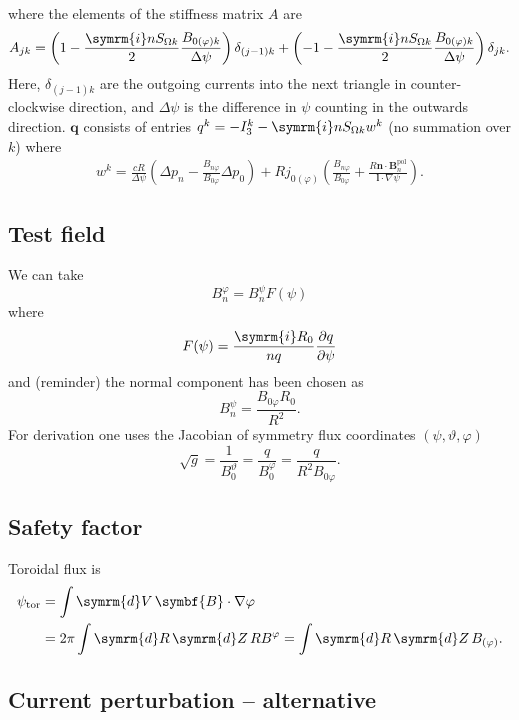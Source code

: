 \documentclass[a4paper, 10pt, english]{article}
\let\temp\vartheta
\let\vartheta\theta
\let\theta\temp
\let\temp\varphi
\let\varphi\phi
\let\phi\temp
\let\vec\symbf
\newcommand*\diff{\ensuremath{\symrm{d}}}
\newcommand*\im{\ensuremath{\symrm{i}}}
\newcommand*\pd[2][]{\ensuremath{\frac{\partial #1}{\partial #2}}}
\newcommand*\pol{\ensuremath{\textrm{pol}}}
\newcommand*\tor{\ensuremath{\textrm{tor}}}
\begin{document}
where the elements of the stiffness matrix $A$ are
\begin{gather}
  A_{jk} = \left( 1 - \frac{\im n S_{\Omega k}}{2} \frac{B_{0 (\phi) k}}{\Delta \psi} \right) \delta_{(j - 1) k} + \left( -1 - \frac{\im n S_{\Omega k}}{2} \frac{B_{0 (\phi) k}}{\Delta \psi} \right) \delta_{j k}.
\end{gather}
Here, $\delta_{(j - 1) k}$ are the outgoing currents into the next triangle in counter-clockwise direction, and $\Delta \psi$ is the difference in $\psi$ counting in the outwards direction. $\vec{q}$ consists of entries $q^{k} = -I_{3}^{k} - \im n S_{\Omega k} w^{k}$ (no summation over $k$) where
\begin{gather}
  w^{k} = \frac{c R}{\Delta \psi} \left( \Delta p_{n} - \frac{B_{n \phi}}{B_{0 \phi}} \Delta p_{0} \right) + R j_{0 (\phi)} \left( \frac{B_{n \phi}}{B_{0 \phi}} + \frac{R \vec{n} \cdot \vec{B}_{n}^{\pol}}{\vec{l} \cdot \nabla \psi} \right).
\end{gather}

\subsection{Test field}

We can take
\[
  B_{n}^{\phi} = B_{n}^{\psi} F(\psi)
\]
where 
\[
  F(\psi) = \frac{\im R_{0}}{n q} \pd[q]{\psi}
\]
and (reminder) the normal component has been chosen as 
\[
  B_{n}^{\psi} = \frac{B_{0 \phi} R_{0}}{R^{2}}.
\]
For derivation one uses the Jacobian of symmetry flux coordinates $(\psi, \theta, \phi)$ 
\[
  \sqrt{g} = \frac{1}{B_{0}^{\theta}} = \frac{q}{B_{0}^{\phi}} = \frac{q}{R^{2} B_{0 \phi}}.
\]

\subsection{Safety factor}

Toroidal flux is
\begin{align}
  \psi_{\tor} &= \int \diff V \, \vec{B} \cdot \nabla \phi \nonumber \\
  &= 2 \pi \int \diff R \, \diff Z \, R B^{\phi} = \int \diff R \, \diff Z \, B_{(\phi)}.
\end{align}

\subsection{Current perturbation -- alternative}
\end{document}
